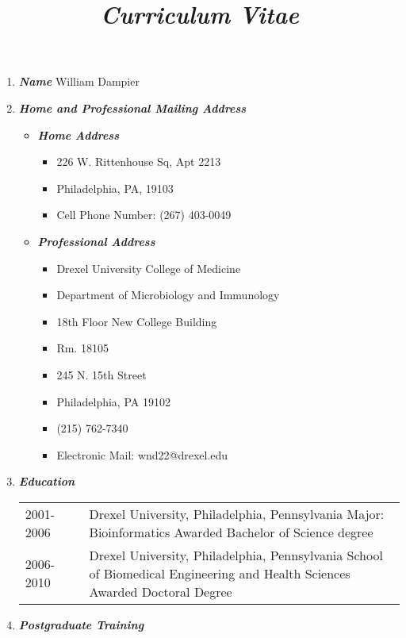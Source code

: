 \documentclass[a4paper,11pt]{article}
\title{\emph{Curriculum Vitae}}
\date{}
\begin{document}
\thispagestyle{firststyle}
\begin{enumerate}
 \item {\LARGE \itshape \bfseries Name} \newline
 William Dampier
 \item {\LARGE \itshape \bfseries Home and Professional Mailing Address}
 \begin{itemize}
  \item[] {\Large \bfseries \itshape Home Address}
  \begin{itemize}
   \item[] 226 W. Rittenhouse Sq, Apt 2213
   \item[] Philadelphia, PA, 19103
   \item[] Cell Phone Number: (267) 403-0049
  \end{itemize}
  \item[] {\Large \bfseries \itshape Professional Address}
  \begin{itemize}
   \item[] Drexel University College of Medicine
   \item[] Department of Microbiology and Immunology
   \item[] 18th Floor New College Building
   \item[] Rm. 18105
   \item[] 245 N. 15th Street
   \item[] Philadelphia, PA 19102
   \item[] (215) 762-7340
   \item[] Electronic Mail:  wnd22@drexel.edu
  \end{itemize}
 \end{itemize}
 \item {\LARGE \itshape \bfseries Education}
 \begin{longtable}{p{}p{}p{}}
  2001-2006 & & Drexel University, Philadelphia, Pennsylvania \newline Major: Bioinformatics \newline Awarded Bachelor of Science degree \\
  2006-2010 & & Drexel University, Philadelphia, Pennsylvania \newline School of Biomedical Engineering and Health Sciences \newline Awarded Doctoral Degree \\
 \end{longtable}
 \item {\LARGE \itshape \bfseries Postgraduate Training}

\end{enumerate}
\end{document}
